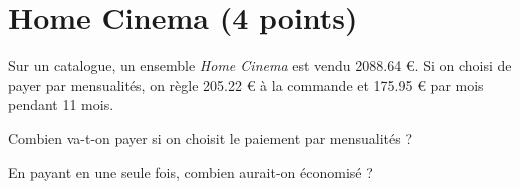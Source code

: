 \section{Home Cinema (4 points)}

Sur un catalogue, un ensemble \textit{Home Cinema} est vendu \num{2088.64} €.
Si on choisi de payer par mensualités, on règle \num{205.22} € à la commande et \num{175.95} € par mois pendant 11 mois.

\begin{questions}
	\question[2] Combien va-t-on payer si on choisit le paiement par mensualités ?
	
	\question[2] En payant en une seule fois, combien aurait-on économisé ?
\end{questions}